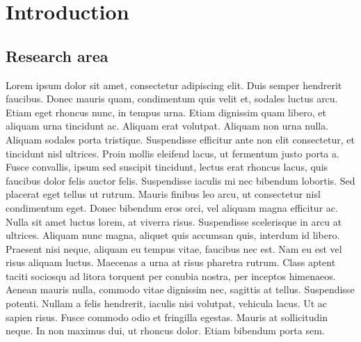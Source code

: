     

\chapter*{Introduction}
\label{cha:intro}

\section*{Research area}

Lorem ipsum dolor sit amet, consectetur adipiscing elit. Duis semper hendrerit faucibus. Donec mauris quam, condimentum quis velit et, sodales luctus arcu. Etiam eget rhoncus nunc, in tempus urna. Etiam dignissim quam libero, et aliquam urna tincidunt ac. Aliquam erat volutpat. Aliquam non urna nulla. Aliquam sodales porta tristique. Suspendisse efficitur ante non elit consectetur, et tincidunt nisl ultrices. Proin mollis eleifend lacus, ut fermentum justo porta a.
Fusce convallis, ipsum sed suscipit tincidunt, lectus erat rhoncus lacus, quis faucibus dolor felis auctor felis. Suspendisse iaculis mi nec bibendum lobortis. Sed placerat eget tellus ut rutrum. Mauris finibus leo arcu, ut consectetur nisl condimentum eget. Donec bibendum eros orci, vel aliquam magna efficitur ac. Nulla sit amet luctus lorem, at viverra risus. Suspendisse scelerisque in arcu at ultrices. Aliquam nunc magna, aliquet quis accumsan quis, interdum id libero.
Praesent nisi neque, aliquam eu tempus vitae, faucibus nec est. Nam eu est vel risus aliquam luctus. Maecenas a urna at risus pharetra rutrum. Class aptent taciti sociosqu ad litora torquent per conubia nostra, per inceptos himenaeos. Aenean mauris nulla, commodo vitae dignissim nec, sagittis at tellus. Suspendisse potenti. Nullam a felis hendrerit, iaculis nisi volutpat, vehicula lacus. Ut ac sapien risus. Fusce commodo odio et fringilla egestas. Mauris at sollicitudin neque. In non maximus dui, ut rhoncus dolor. Etiam bibendum porta sem.


